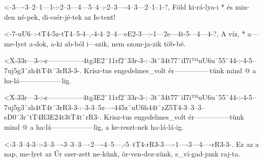   {<-3----3--2--1---1-:-2--3---4---5--4--:-2--3----4--3---2--1--1-?,}
  {  Föld ki-rá-lya-i * és min-den né-pek, di-csér-jé-tek az Is-tent!}

  {<-7-uU6--:-tT4-5z-tT4--5-4--,-4-4--2--4---eE2-3---:-1---2e---4t-5---4---4-?,}
  {  A víz, * a---me-lyet a-dok, a-ki ab-ból i---szik, nem szom-ja-zik töb-bé.}




  {<X-33r---3-:-¢---------------4tg3E2¨11rf2¨33r-3-:--3t¨34t77¨iI7i™uU6u¨55¨44-:-4-5--7uj5g3¨zh4tT4t¨3rR3-3-.}
  {   Krisz-tus engedelmes_volt ér---------------tünk mind          @            a ha-lá------------------lig.}



  {<X-33r---3-:-¢---------------4tg3E2¨11rf2¨33r-3-:--3t¨34t77¨iI7i™uU6u¨55¨44-:-4-5--7uj5g3¨zh4tT4t¨3rR3-3-:--3-3--5z----445z¨uU6h44t¨zZ5T4-3--3--3--eD0¨3r¨tT4R3E24t3tT4t¨rR3-.}
  {   Krisz-tus engedelmes_volt ér---------------tünk mind          @            a ha-lá------------------lig, a ke-reszt-nek                ha-lá-lá-ig.}



  {<-3--3--4-3--:-3--3----3--3--3----2----4--5---,-5--tT4-rR3-3---:-1----3---4----rR3-3-.}
  {  Ez az a nap, me-lyet az Úr szer-zett ne-künk, ör-ven-dez-zünk, s_ví-gad-junk raj-ta.}




